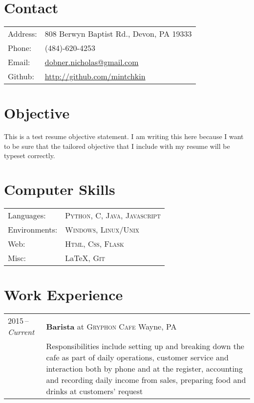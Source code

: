 \documentclass[a4paper,10pt]{article}
\begin{document}
\pagestyle{empty} %

\newfontfamily{} %

\par{\bigskip\par}

\section{Contact}
\begin{tabular}{@{}>{\raggedleft\arraybackslash}m{6.5em}l}
    Address:   & 808 Berwyn Baptist Rd., Devon, PA 19333 \\
    Phone:     & (484)-620-4253 \\
    Email:     & \href{mailto:dobner.nicholas@gmail.com}{dobner.nicholas@gmail.com} \\
    Github:    & \href{https://github.com/mintchkin}{http://github.com/mintchkin}
\end{tabular}

\section{Objective}
This is a test resume objective statement. I am writing this here because I want to be sure that the
tailored objective that I include with my resume will be typeset correctly.

\section{Computer Skills}
\begin{tabular}{@{}>{\raggedleft\arraybackslash}m{6.5em}l}
    Languages:      & \textsc{Python}, \textsc{C}, \textsc{Java}, \textsc{Javascript} \\
    Environments:   & \textsc{Windows}, \textsc{Linux/Unix} \\
    Web:            & \textsc{Html}, \textsc{Css}, \textsc{Flask} \\
    Misc:           & {\LaTeX}, \textsc{Git}
\end{tabular}

\section{Work Experience}
\begin{tabularx}{\textwidth}{@{}p{6em}|X@{}}
    2015\,--\,\emph{Current} & \textbf{Barista} at \textsc{Gryphon Cafe} \hfill Wayne, PA \\
    & \footnotesize{Responsibilities include setting up and breaking down the cafe as part of daily operations, customer service and interaction both by phone and at the register, accounting and recording daily income from sales, preparing food and drinks at customers' request} \\
\end{tabularx}
\end{document}
